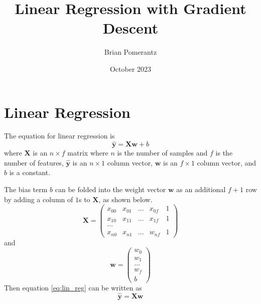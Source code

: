 \documentclass{article}
\title{Linear Regression with Gradient Descent}
\author{Brian Pomerantz}
\date{October 2023}
\begin{document}
\maketitle

\section{Linear Regression}
The equation for linear regression is
\begin{equation}
    \hat{\mathbf{y}} = \mathbf{X}\mathbf{w} + b
    \label{eq:lin_reg}
\end{equation}
where $\mathbf{X}$ is an $n\times f$ matrix where $n$ is the number of samples and $f$ is the number of features, $\hat{\mathbf{y}}$ is an $n\times 1$ column vector, $\mathbf{w}$ is an $f\times 1$ column vector, and $b$ is a constant.

The bias term $b$ can be folded into the weight vector $\mathbf{w}$ as an additional $f+1$ row by adding a column of $1$s to $\mathbf{X}$, as shown below.
\begin{equation}
    \mathbf{X} =
    \begin{pmatrix}
        x_{00} & x_{01} & ... & x_{0f} & 1 \\
        x_{10} & x_{11} & ... & x_{1f} & 1 \\
        ... \\
        x_{n0} & x_{n1} & ... & w_{nf} & 1
    \end{pmatrix}
\end{equation}
and
\begin{equation}
    \mathbf{w} =
    \begin{pmatrix}
        w_0 \\
        w_1 \\
        ... \\
        w_f \\
        b
    \end{pmatrix}
\end{equation}
Then equation \eqref{eq:lin_reg} can be written as
\begin{equation}
    \hat{\mathbf{y}} = \mathbf{X}\mathbf{w}
\end{equation}
\end{document}
